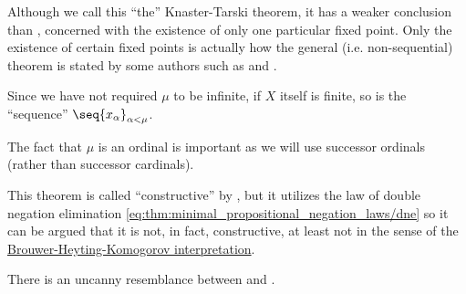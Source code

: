 \begin{comments}
  \item Although we call this \enquote{the} Knaster-Tarski theorem, it has a weaker conclusion than , concerned with the existence of only one particular fixed point. Only the existence of certain fixed points is actually how the general (i.e. non-sequential) theorem is stated by some authors such as  and .

  \item Since we have not required \( \mu \) to be infinite, if \( X \) itself is finite, so is the \enquote{sequence} \( \seq{ x_\alpha }_{\alpha < \mu} \).

  \item The fact that \( \mu \) is an ordinal is important as we will use successor ordinals (rather than successor cardinals).

  \item This theorem is called \enquote{constructive} by , but it utilizes the law of double negation elimination \eqref{eq:thm:minimal_propositional_negation_laws/dne} so it can be argued that it is not, in fact, constructive, at least not in the sense of the \hyperref[con:brouwer_heyting_kolmogorov_interpretation]{Brouwer-Heyting-Komogorov interpretation}.

  \item There is an uncanny resemblance between  and .
\end{comments}
